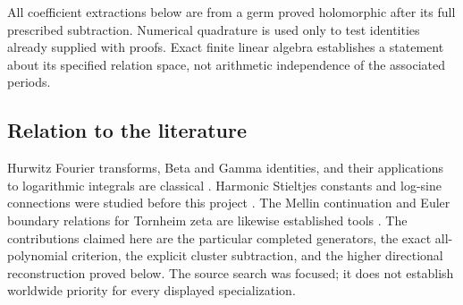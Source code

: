 All coefficient extractions below are from a germ proved holomorphic
after its full prescribed subtraction. Numerical quadrature is used
only to test identities already supplied with proofs. Exact finite
linear algebra establishes a statement about its specified relation
space, not arithmetic independence of the associated periods.

\subsection{Relation to the literature}

Hurwitz Fourier transforms, Beta and Gamma identities, and their
applications to logarithmic integrals are classical
\cite{DLMFHurwitz,DLMFBeta,EspinosaMoll}. Harmonic Stieltjes constants
and log-sine connections were studied before this project
\cite{Kargin,Can}. The Mellin continuation and Euler boundary relations
for Tornheim zeta are likewise established tools \cite{BorweinDilcher}.
The contributions claimed here are the particular completed generators,
the exact all-polynomial criterion, the explicit cluster subtraction,
and the higher directional reconstruction proved below. The source
search was focused; it does not establish worldwide priority for every
displayed specialization.
